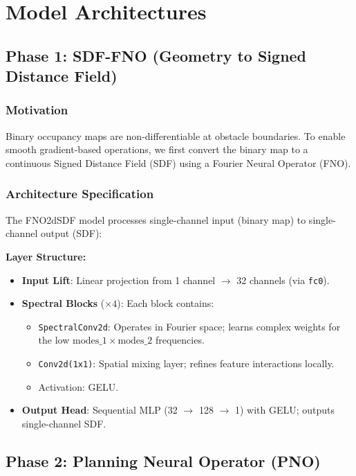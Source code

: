 \documentclass[11pt,a4paper]{article}
\theoremstyle{definition}
\begin{document}
\section{Model Architectures}\label{sec:architecture}

\subsection{Phase 1: SDF-FNO (Geometry to Signed Distance Field)}

\subsubsection{Motivation}
Binary occupancy maps are non-differentiable at obstacle boundaries. To enable smooth gradient-based operations,
we first convert the binary map to a continuous Signed Distance Field (SDF) using a Fourier Neural Operator (FNO).

\subsubsection{Architecture Specification}
The FNO2dSDF model processes single-channel input (binary map) to single-channel output (SDF):

\noindent
\textbf{Layer Structure:}
\begin{itemize}
  \item \textbf{Input Lift}: Linear projection from 1 channel $\to$ 32 channels (via \texttt{fc0}).
  \item \textbf{Spectral Blocks} ($\times 4$): Each block contains:
    \begin{itemize}
      \item \texttt{SpectralConv2d}: Operates in Fourier space; learns complex weights for the low $\text{modes}\_1 \times \text{modes}\_2$ frequencies.
      \item \texttt{Conv2d(1x1)}: Spatial mixing layer; refines feature interactions locally.
      \item Activation: GELU.
    \end{itemize}
  \item \textbf{Output Head}: Sequential MLP (32 $\to$ 128 $\to$ 1) with GELU; outputs single-channel SDF.
\end{itemize}

\subsection{Phase 2: Planning Neural Operator (PNO)}
\end{document}
